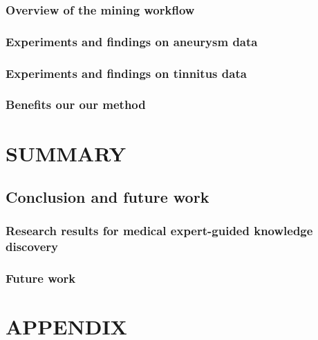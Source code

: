 \documentclass[
]{book}
\begin{document}
\hypertarget{overview-of-the-mining-workflow-2}{%
\section{Overview of the mining workflow}\label{overview-of-the-mining-workflow-2}}

\hypertarget{experiments-and-findings-on-aneurysm-data}{%
\section{Experiments and findings on aneurysm data}\label{experiments-and-findings-on-aneurysm-data}}

\hypertarget{experiments-and-findings-on-tinnitus-data}{%
\section{Experiments and findings on tinnitus data}\label{experiments-and-findings-on-tinnitus-data}}

\hypertarget{benefits-our-our-method-3}{%
\section{Benefits our our method}\label{benefits-our-our-method-3}}

\hypertarget{part-summary}{%
\part{SUMMARY}\label{part-summary}}

\hypertarget{summary}{%
\chapter{Conclusion and future work}\label{summary}}

\hypertarget{research-results-for-medical-expert-guided-knowledge-discovery}{%
\section{Research results for medical expert-guided knowledge discovery}\label{research-results-for-medical-expert-guided-knowledge-discovery}}

\hypertarget{future-work}{%
\section{Future work}\label{future-work}}

\hypertarget{part-appendix}{%
\part{APPENDIX}\label{part-appendix}}

\printbibliography
\end{document}
